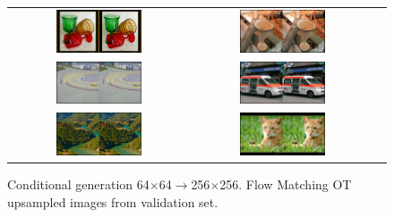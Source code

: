 \documentclass{article}
\begin{document}
\begin{figure}
\begin{tabular}{@{}ccc@{}}
     \includegraphics[width=0.5\textwidth]{figures/upsampled/upsampled2/upsample_70.png} & \includegraphics[width=0.5\textwidth]{figures/upsampled/upsampled2/upsample_72.png} \\
     \includegraphics[width=0.5\textwidth]{figures/upsampled/upsampled2/upsample_77.png} & \includegraphics[width=0.5\textwidth]{figures/upsampled/upsampled2/upsample_80.png} \\
     \includegraphics[width=0.5\textwidth]{figures/upsampled/upsampled2/upsample_95.png} & \includegraphics[width=0.5\textwidth]{figures/upsampled/upsampled2/upsample_113.png} \\
\end{tabular}
    \caption{Conditional generation 64$\times$64$\rightarrow$256$\times$256. Flow Matching OT upsampled images from validation set.}
    \label{fig:upsampled_2}
\end{figure}
\end{document}
